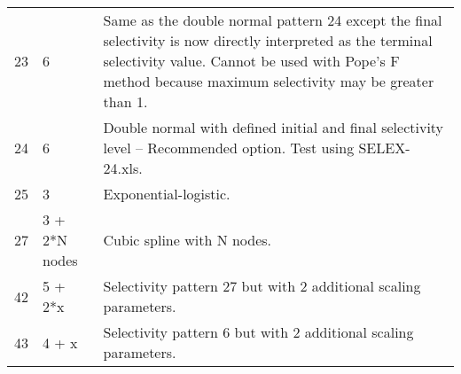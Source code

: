 \begin{longtable}{p{2cm} p{3cm} p{10cm}}
	23 \Tstrut& 6 & Same as the double normal pattern 24 except the final selectivity is now directly interpreted as the terminal selectivity value. Cannot be used with Pope's F method because maximum selectivity may be greater than 1.\\
	24 \Tstrut& 6 & Double normal with defined initial and final selectivity level – Recommended option.  Test using SELEX-24.xls. \\
	25 \Tstrut& 3 & Exponential-logistic. \\
	27 \Tstrut& 3 + 2*N nodes & Cubic spline with N nodes. \\
	42 \Tstrut& 5 + 2*x & Selectivity pattern 27 but with 2 additional scaling parameters. \\
	43 \Tstrut& 4 + x & Selectivity pattern 6 but with 2 additional scaling parameters.\Bstrut\\
	\hline
\end{longtable}




